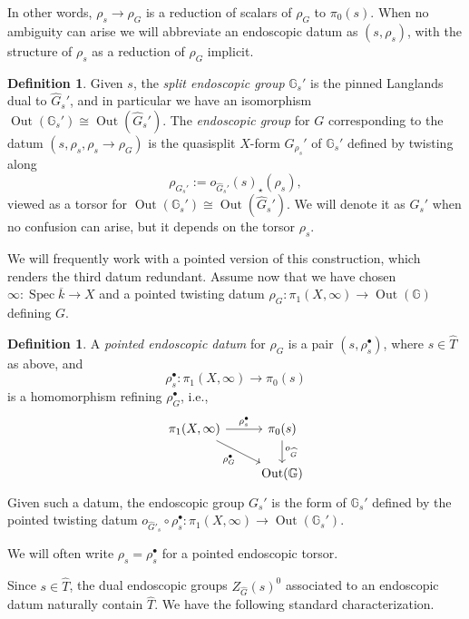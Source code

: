 \documentclass[openany]{amsbook}
\theoremstyle{definition}
\newtheorem{definition}[theorem]{Definition}
\theoremstyle{remark}
\numberwithin{equation}{section}
\newcommand{\G}{\mathbb{G}}
\newcommand{\ol}[1]{\overline{#1}}
\renewcommand{\-}{\operatorname{-}}
\newcommand{\Spec}{\operatorname{Spec}}
\newcommand{\Out}{\operatorname{Out}}
\begin{document}
In other words, $\rho_s \to \rho_G$ is a reduction of scalars of $\rho_G$ to $\pi_0(s)$. When no ambiguity can arise we will abbreviate an endoscopic datum as $(s, \rho_s)$, with the structure of $\rho_s$ as a reduction of $\rho_G$ implicit.

\begin{definition}
    Given $s$, the \emph{split endoscopic group} $\G_{s}'$ is the pinned Langlands dual to $\widehat{G}_{s}'$, and in particular we have an isomorphism $\Out(\G_s') \cong \Out(\widehat{G}_{s}')$. The \emph{endoscopic group} for $G$ corresponding to the datum $(s, \rho_s, \rho_s \to \rho_G)$ is the quasisplit $X$-form $G_{\rho_s}'$ of $\G_{s}'$ defined by twisting along $$\rho_{G_{s}'} := o_{\widehat{G}_s'}(s)_\star(\rho_{s}),$$ viewed as a torsor for $\Out(\G_{s}') \cong \Out(\widehat{G}_{s}')$. We will denote it as $G_s'$ when no confusion can arise, but it depends on the torsor $\rho_s$. 
\end{definition}


We will frequently work with a pointed version of this construction, which renders the third datum redundant. Assume now that we have chosen $\infty : \Spec \ol{k} \to X$ and a pointed twisting datum $\rho_G : \pi_1(X, \infty) \to \Out(\G)$ defining $G$.

\begin{definition}\label{def.pointed.end.datum}
    A \emph{pointed endoscopic datum} for $\rho_G$ is a pair $(s, \rho_{s}^{\bullet})$, where
    $s \in \widehat{T}$ as above, and 
    $$
        \rho_s^\bullet : \pi_1(X, \infty) \to \pi_0(s)
    $$
    is a homomorphism refining $\rho_G^\bullet$, i.e.,
    $$
        \begin{tikzcd}[ampersand replacement=\&]
            \pi_1(X, \infty) \ar[r, "\rho_{s}^\bullet"] \ar[dr, "\rho_{G}^\bullet" below left] \& \pi_0(s) \ar[d, "o_{\widehat{G}}"] \\
            \& \Out(\G)
        \end{tikzcd}
    $$
    Given such a datum, the endoscopic group $G_{s}'$ is the form of $\G_{s}'$ defined by the pointed twisting datum $o_{\widehat{G}'_s} \circ \rho_{s}^\bullet : \pi_1(X, \infty) \to \Out(\G_{s}')$. 

    We will often write $\rho_s = \rho_s^{\bullet}$ for a pointed endoscopic torsor.
\end{definition}



Since $s \in \widehat{T}$, the dual endoscopic groups $Z_{\widehat{G}}(s)^0$ associated to an endoscopic datum naturally contain $\widehat{T}$. We have the following standard characterization.
\end{document}
